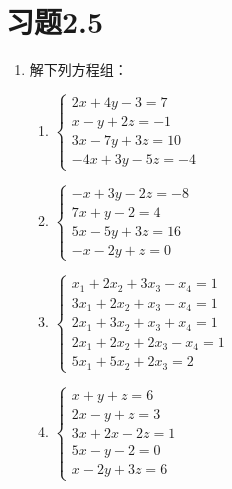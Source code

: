 \section*{习题2.5}
\begin{enumerate}
    \item 解下列方程组：
\begin{multicols}{2}
\begin{enumerate}
    \item $\begin{cases}
2x+4y-3=7\\
x-y+2z=-1\\
3x-7y+3z=10\\
-4x+3y-5z=-4        
    \end{cases}$
    \item $\begin{cases}
-x+3y-2z=-8\\
7x+y-2=4\\ 5x-5y+3z=16\\ -x-2y+z=0        
    \end{cases}$
    \item $\begin{cases}
 x_1+2x_2+3x_3-x_4=1\\
3x_1+2x_2+x_3-x_4=1\\
2x_1+3x_2+x_3+x_4=1\\
2x_1 +2x_2+2x_3-x_4=1\\
5x_1+5x_2+2x_3 =2     
    \end{cases}$
    \item $\begin{cases}
        x+y+z=6\\
        2x-y+z=3\\
        3x+2x-2z=1\\
        5x-y-2=0\\
        x-2y+3z=6        
    \end{cases}$
\end{enumerate}
\end{multicols}



\end{enumerate}
